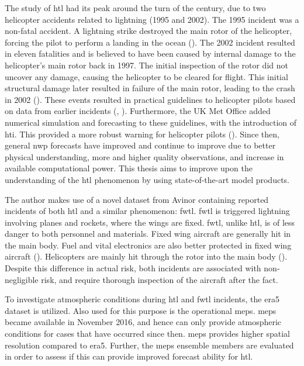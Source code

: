The study of \acrshort{htl} had its peak around the turn of the century, due to two helicopter accidents related to lightning (1995 and 2002). The 1995 incident was a non-fatal accident. A lightning strike destroyed the main rotor of the helicopter, forcing the pilot to perform a landing in the ocean (\cite{smart1997}). The 2002 incident resulted in eleven fatalities and is believed to have been caused by internal damage to the helicopter's main rotor back in 1997. The initial inspection of the rotor did not uncover any damage, causing the helicopter to be cleared for flight. This initial structural damage later resulted in failure of the main rotor, leading to the crash in 2002 (\cite{smart2005}). These events resulted in practical guidelines to helicopter pilots based on data from earlier incidents (\cite{lande1999}, \cite{hardwick1999}). Furthermore, the UK Met Office added numerical simulation and forecasting to these guidelines, with the introduction of \acrfull{hti}. This provided a more robust warning for helicopter pilots (\cite{wilkinson2013}). Since then, general \acrfull{nwp} forecasts have improved and continue to improve due to better  physical understanding, more and higher quality observations, and increase in available computational power. This thesis aims to improve upon the understanding of the \acrshort{htl} phenomenon by using state-of-the-art model products.

The author makes use of a novel dataset from Avinor containing reported incidents of both  \acrshort{htl} and a similar phenomenon: \acrfull{fwtl}. \acrshort{fwtl} is triggered lightning involving planes and rockets, where the wings are fixed. \acrshort{fwtl}, unlike \acrshort{htl}, is of less danger to both personnel and materials. Fixed wing aircraft are generally hit in the main body. Fuel and vital electronics are also better protected in fixed wing aircraft (\cite{petrov2012}). Helicopters are mainly hit through the rotor into the main body (\cite{lande1999}). Despite this difference in actual risk, both incidents are associated with non-negligible risk, and require thorough inspection of the aircraft after the fact.

To investigate atmospheric conditions during \acrshort{htl} and \acrshort{fwtl} incidents, the \acrfull{era5} dataset is utilized. Also used for this purpose is the operational \acrfull{meps}. \acrshort{meps} became available in November 2016, and hence can only provide atmospheric conditions for cases that have occurred since then. \acrshort{meps} provides higher spatial resolution compared to \acrshort{era5}. Further, the \acrshort{meps} ensemble members are evaluated in order to assess if this can provide improved forecast ability for \acrshort{htl}.

